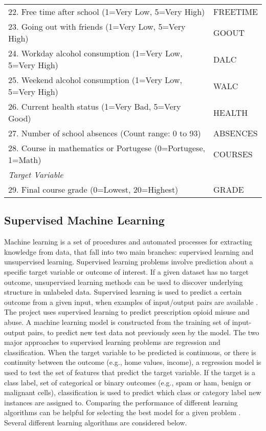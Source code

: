 \documentclass[sigconf]{acmart}
\begin{document}
\begin{table*}[ht]
\begin{tabular}{ll}
    22. Free time after school (1=Very Low, 5=Very High) & FREETIME  \\
    23. Going out with friends (1=Very Low, 5=Very High) & GOOUT  \\
    24. Workday alcohol consumption (1=Very Low, 5=Very High) & DALC  \\
    25. Weekend alcohol consumption (1=Very Low, 5=Very High) & WALC  \\
    26. Current health status (1=Very Bad, 5=Very Good) & HEALTH  \\ 
    27. Number of school absences (Count range: 0 to 93) & ABSENCES  \\
    28. Course in mathematics or Portugese (0=Portugese, 1=Math) & COURSES  \\
    \midrule
    \textit{Target Variable} &  \\
    \midrule
    29. Final course grade (0=Lowest, 20=Highest) & GRADE \\
    \bottomrule
  \end{tabular}
\end{table*}


\subsection{Supervised Machine Learning} 

Machine learning is a set of procedures and automated processes for extracting 
knowledge from data, that fall into two main branches: supervised learning and 
unsupervised learning. Supervised learning problems involve prediction about a 
specific target variable or outcome of interest. If a given dataset has no 
target outcome, unsupervised learning methods can be used to discover underlying 
structure in unlabeled data. Supervised learning is used to predict a certain 
outcome from a given input, when examples of input/output pairs are available 
\cite{muller17}. The project uses supervised learning to predict prescription 
opioid misuse and abuse. A machine learning model is constructed from the 
training set of input-output pairs, to predict new test data not previously 
seen by the model. The two major approaches to supervised learning problems are 
regression and classification. When the target variable to be predicted is 
continuous, or there is continuity between the outcome (e.g., home values, 
income), a regression model is used to test the set of features that predict 
the target variable. If the target is a class label, set of categorical or 
binary outcomes (e.g., spam or ham, benign or malignant cells), classification 
is used to predict which class or category label new instances are assigned to.
Comparing the performance of different learning algorithms can be helpful for 
selecting the best model for a given problem \cite{raschka17}. Several different 
learning algorithms are considered below.
\end{document}
